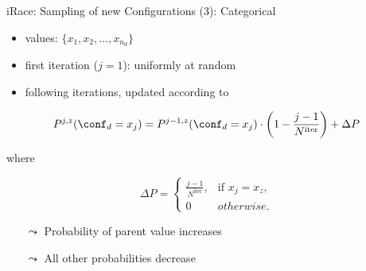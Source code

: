\begin{frame}[c]{iRace: Sampling of new Configurations (3): Categorical}

\begin{itemize}
  \item values: $\{x_1,x_2,\ldots,x_{n_d}\}$
  \item first iteration ($j=1$): uniformly at random
  \item following iterations, updated according to
\end{itemize}

\begin{equation}
P^{j,z}(\conf_d = x_j)  = P^{j-1,z}(\conf_d=x_j)\cdot \left(1 - \frac{j-1}{N^{\text{iter}}} \right) + \Delta P \nonumber
\end{equation}

where

\begin{equation}
\Delta P = \begin{cases}
  \frac{j-1}{N^{\text{iter}}}, 	& \text{if } x_j = x_z,\\
  0								& otherwise.
\end{cases}\nonumber
\end{equation}

\begin{itemize}
  \item[$\leadsto$] Probability of parent value increases
  \item[$\leadsto$] All other probabilities decrease
\end{itemize}

\end{frame}



